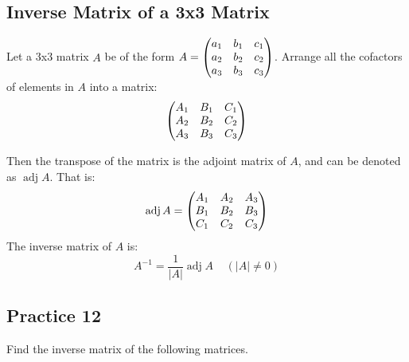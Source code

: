 \documentclass{report}
\begin{document}
\begin{multicols}{2}
  \subsection*{Inverse Matrix of a 3x3 Matrix}

  Let a 3x3 matrix $A$ be of the form $A = \begin{pmatrix} a_1 & b_1 & c_1 \\ a_2 & b_2 & c_2
      \\ a_3 & b_3 & c_3 \end{pmatrix}$. Arrange all the cofactors of elements in $A$ into a
  matrix:
  \[
    \begin{pmatrix}
      A_1 & B_1 & C_1 \\
      A_2 & B_2 & C_2 \\
      A_3 & B_3 & C_3
    \end{pmatrix}
  \]

  Then the transpose of the matrix is the adjoint matrix of $A$, and can be
  denoted as $\operatorname{adj}A$. That is:
  \[
    \operatorname{adj}A = \begin{pmatrix}
      A_1 & A_2 & A_3 \\
      B_1 & B_2 & B_3 \\
      C_1 & C_2 & C_3
    \end{pmatrix}
  \]
  The inverse matrix of $A$ is:
  \[
    A^{-1} = \frac{1}{|A|} \operatorname{adj}A
    \ \ \ \ \ (|A| \neq 0)
  \]

  \subsection{Practice 12}

  Find the inverse matrix of the following matrices.


\end{multicols}
\end{document}
